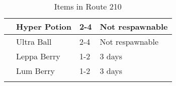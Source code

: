 \begin{longtable}{|| l l l l ||}%
\hline%
&Hyper Potion&2{-}4&Not respawnable\\%
\hline%
&Ultra Ball&2{-}4&Not respawnable\\%
\hline%
&Leppa Berry&1{-}2&3 days\\%
\hline%
&Lum Berry&1{-}2&3 days\\%
\hline%
\endhead%
\hline%
\caption{Items in Route 210}%
\label{tab:Route210Items}%
\end{longtable}